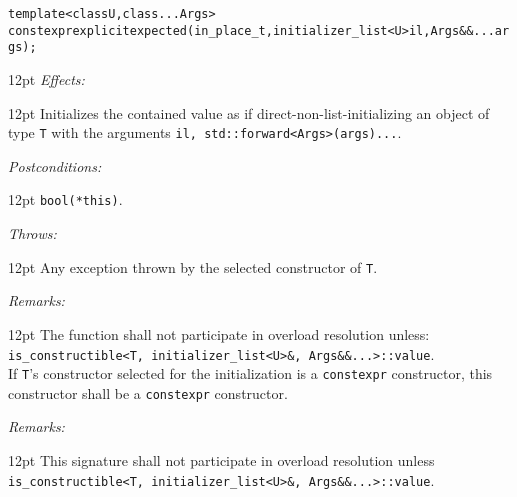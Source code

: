 \documentclass[a4paper,10pt]{article}
\newcommand{\cpp}[1]{\lstinline{#1}}
\newcommand{\wordingItem}[1]{\noindent\textit{#1:}}
\newenvironment{wordingTextItem}[1]{\wordingItem{#1}\vspace{2pt}\noindent\begin{adjustwidth}{12pt}{}}{\vspace{2pt}\end{adjustwidth}}
\newenvironment{wordingPara}{\begin{adjustwidth}{12pt}{}}{\end{adjustwidth}}
\begin{document}
\begin{alltt}
template <class U, class... Args>
constexpr explicit expected(in_place_t, initializer_list<U> il, Args&&... args); 
\end{alltt}
\begin{wordingPara}
\begin{wordingTextItem}{Effects}
Initializes the contained value as if direct-non-list-initializing an object of type \cpp{T} with the arguments \cpp{il, std::forward<Args>(args)...}.
\end{wordingTextItem}
\begin{wordingTextItem}{Postconditions}
\cpp{bool(*this)}.
\end{wordingTextItem}
\begin{wordingTextItem}{Throws}
Any exception thrown by the selected constructor of \cpp{T}.
\end{wordingTextItem}
\begin{wordingTextItem}{Remarks}
The function shall not participate in overload resolution unless:\\
\noindent
\cpp{is_constructible<T, initializer_list<U>&, Args&&...>::value}.\\

\noindent
If \cpp{T}'s constructor selected for the initialization is a \cpp{constexpr} constructor, this constructor shall be a \cpp{constexpr} constructor.
\end{wordingTextItem}
\begin{wordingTextItem}{Remarks}
This signature shall not participate in overload resolution unless\\
\cpp{is_constructible<T, initializer_list<U>&, Args&&...>::value}.
\end{wordingTextItem}
\end{wordingPara}
\end{document}
